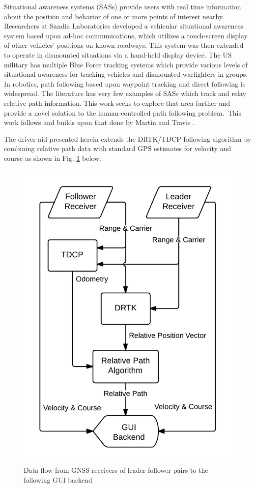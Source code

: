 \documentclass[twocolumn,10pt]{article}
\begin{document}
  Situational awareness systems (SASs) provide users with real time information about the position and behavior of one or more points of interest nearby.
  Researchers at Sandia Laboratories \cite{riblett2007} developed a vehicular situational awareness system based upon ad-hoc communications, which utilizes a touch-screen display of other vehicles' positions on known roadways. This system was then extended to operate in dismounted situations via a hand-held display device.
  The US military has multiple Blue Force tracking \cite{luddy2005challenge} systems which provide various levels of situational awareness for tracking vehicles and dismounted warfighters in groups.
  In robotics, path following based upon waypoint tracking and direct following is widespread.
  The literature has very few examples of SASs which track and relay relative path information. This work seeks to explore that area further and provide a novel solution to the human-controlled path following problem.\
  This work follows and builds upon that done by Martin \cite{ScottThesis} and Travis \cite{travisdiss}.
  
  The driver aid presented herein extends the DRTK/TDCP following algorithm by combining relative path data with standard GPS estimates for velocity and course as shown in Fig. \ref{fig:data_flow} below.

  \begin{figure}[ht] \centering
    \includegraphics[width=0.8\columnwidth]{../graphics/data_algo.png}
    \caption{Data flow from GNSS receivers of leader-follower pairs to the following GUI backend}
    \label{fig:data_flow}
  \end{figure}
\end{document}
